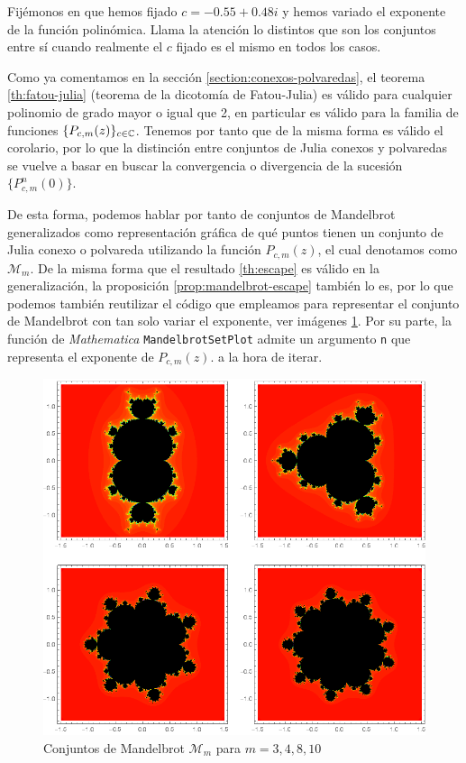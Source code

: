Fijémonos en que hemos fijado $c=-0.55+0.48i$ y hemos variado el exponente de la función polinómica. Llama la atención lo distintos que son los conjuntos entre sí cuando realmente el $c$ fijado es el mismo en todos los casos. 

Como ya comentamos en la sección \ref{section:conexos-polvaredas}, el teorema \ref{th:fatou-julia} (teorema de la dicotomía de Fatou-Julia) es válido para cualquier polinomio de grado mayor o igual que 2, en particular es válido para la familia de funciones $\{P_{c,m}(z)\}_{c\in\mathbb{C}}$. Tenemos por tanto que de la misma forma es válido el corolario, por lo que la distinción entre conjuntos de Julia conexos y polvaredas se vuelve a basar en buscar la convergencia o divergencia de la sucesión $\{P_{c,m}^n(0)\}$.

De esta forma, podemos hablar por tanto de conjuntos de Mandelbrot generalizados como representación gráfica de qué puntos tienen un conjunto de Julia conexo o polvareda utilizando la función $P_{c,m}(z)$, el cual denotamos como $\mathcal{M}_m$. De la misma forma que el resultado \ref{th:escape} es válido en la generalización, la proposición \ref{prop:mandelbrot-escape} también lo es, por lo que podemos también reutilizar el código que empleamos para representar el conjunto de Mandelbrot con tan solo variar el exponente, ver imágenes \ref{fig:mandelbrot-generalizados}. Por su parte, la función de \textit{Mathematica} \verb|MandelbrotSetPlot| admite un argumento \verb|n| que representa el exponente de $P_{c,m}(z).$ a la hora de iterar.

\begin{figure}[ht]
  \centering
  \includegraphics[scale=0.7]{./img/C3/mandelbrot-generalizado.png}
  \caption{Conjuntos de Mandelbrot $\mathcal{M}_m$ para $m=3,4,8,10$}
  \label{fig:mandelbrot-generalizados}
\end{figure}

